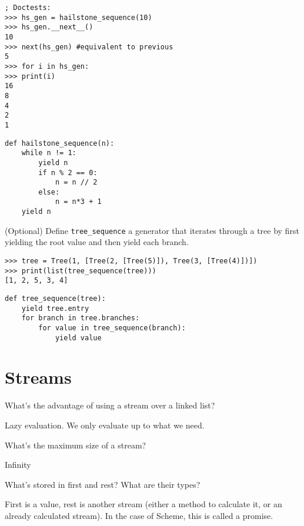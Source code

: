 \documentclass{exam}
\begin{document}
\begin{questions}
\begin{blocksection}
\begin{lstlisting}
; Doctests:
>>> hs_gen = hailstone_sequence(10)
>>> hs_gen.__next__()
10
>>> next(hs_gen) #equivalent to previous
5
>>> for i in hs_gen:
>>>	print(i)
16
8
4
2
1
\end{lstlisting}

\begin{solution}[1.5in]
\begin{lstlisting}
def hailstone_sequence(n):
	while n != 1:
		yield n
		if n % 2 == 0:
			n = n // 2
		else:
			n = n*3 + 1
	yield n
\end{lstlisting}
\end{solution}
\end{blocksection}

\question (Optional) Define \texttt{tree\_sequence} a generator that iterates through a tree by first yielding the root value and then yield each branch.
\begin{lstlisting}
>>> tree = Tree(1, [Tree(2, [Tree(5)]), Tree(3, [Tree(4)])])
>>> print(list(tree_sequence(tree)))
[1, 2, 5, 3, 4]
\end{lstlisting}

\begin{solution}[0.5in]
\begin{lstlisting}
def tree_sequence(tree):
	yield tree.entry
	for branch in tree.branches:
		for value in tree_sequence(branch):
			yield value
\end{lstlisting}
\end{solution}

\section{Streams}
\begin{blocksection}
\question What’s the advantage of using a stream over a linked list?
\begin{solution}[0.5in] 
Lazy evaluation. We only evaluate up to what we need.
\end{solution}

\question What’s the maximum size of a stream?
\begin{solution}[0.5in]
Infinity
\end{solution}

\question What’s stored in first and rest? What are their types? 
\begin{solution}[0.5in]
First is a value, rest is another stream (either a method to calculate it, or an already calculated stream). In the case of Scheme, this is called a promise.
\end{solution}


\end{blocksection}
\end{questions}
\end{document}
